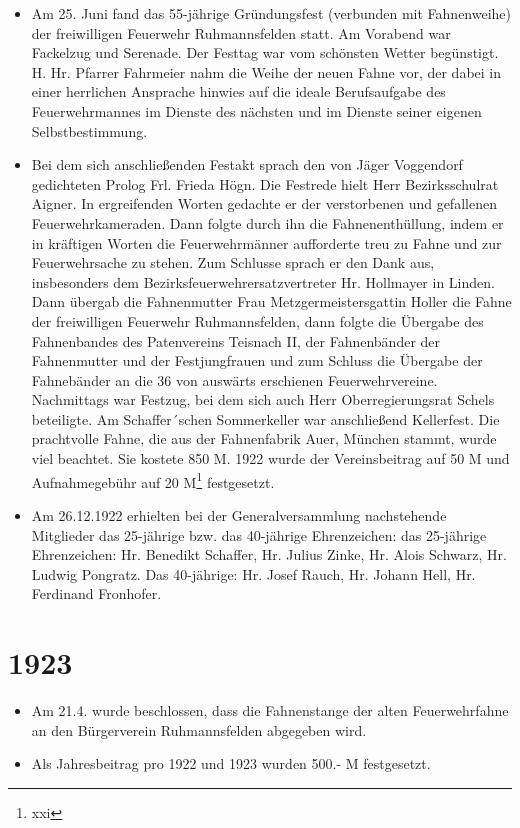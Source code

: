 \documentclass[12pt,a4paper]{book}
\begin{document}
\begin{itemize}
\item Am 25. Juni fand das 55-jährige Gründungsfest (verbunden mit
Fahnenweihe) der freiwilligen Feuerwehr Ruhmannsfelden statt. Am
Vorabend war Fackelzug und Serenade. Der Festtag war vom schönsten
Wetter begünstigt. H. Hr. Pfarrer Fahrmeier nahm die Weihe der neuen
Fahne vor, der dabei in einer herrlichen Ansprache hinwies auf die
ideale Berufsaufgabe des Feuerwehrmannes im Dienste des nächsten und im
Dienste seiner eigenen Selbstbestimmung.

\item Bei dem sich anschließenden Festakt sprach den von Jäger
Voggendorf gedichteten Prolog Frl. Frieda Högn. Die Festrede hielt Herr
Bezirksschulrat Aigner. In ergreifenden Worten gedachte er der
verstorbenen und gefallenen Feuerwehrkameraden. Dann folgte durch ihn
die Fahnenenthüllung, indem er in kräftigen Worten die Feuerwehrmänner
aufforderte treu zu Fahne und zur Feuerwehrsache zu stehen. Zum Schlusse
sprach er den Dank aus, insbesonders dem Bezirksfeuerwehrersatzvertreter
Hr. Hollmayer in Linden. Dann übergab die Fahnenmutter Frau
Metzgermeistersgattin Holler die Fahne der freiwilligen Feuerwehr
Ruhmannsfelden, dann folgte die Übergabe des Fahnenbandes des
Patenvereins Teisnach II, der Fahnenbänder der Fahnenmutter und der
Festjungfrauen und zum Schluss die Übergabe der Fahnebänder an die 36
von auswärts erschienen Feuerwehrvereine. Nachmittags war Festzug, bei
dem sich auch Herr Oberregierungsrat Schels beteiligte. Am
Schaffer´schen Sommerkeller war anschließend Kellerfest. Die prachtvolle
Fahne, die aus der Fahnenfabrik Auer, München stammt, wurde viel
beachtet. Sie kostete 850 M. 1922 wurde der Vereinsbeitrag auf 50 M und
Aufnahmegebühr auf 20 M\footnote{xxi} festgesetzt.

\item Am 26.12.1922 erhielten bei der Generalversammlung nachstehende
Mitglieder das 25-jährige bzw. das 40-jährige Ehrenzeichen: das
25-jährige Ehrenzeichen: Hr. Benedikt Schaffer, Hr. Julius Zinke, Hr.
Alois Schwarz, Hr. Ludwig Pongratz. Das 40-jährige: Hr. Josef Rauch, Hr.
Johann Hell, Hr. Ferdinand Fronhofer.
\end{itemize}

\section*{1923}

\begin{itemize}
\item Am 21.4. wurde beschlossen, dass die Fahnenstange der alten
Feuerwehrfahne an den Bürgerverein Ruhmannsfelden abgegeben wird.

\item Als Jahresbeitrag pro 1922 und 1923 wurden 500.- M festgesetzt.
\end{itemize}
\end{document}
